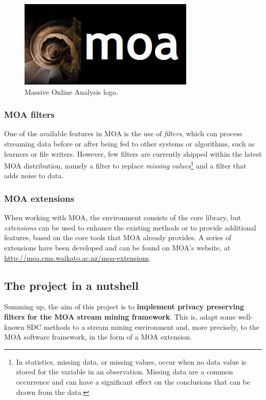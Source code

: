 \begin{figure}[h]
	\centering
	\includegraphics[width=0.4\linewidth]{figures/moa-logo.jpg}
	\caption[MOA logo.]{Massive Online Analysis logo.}
	\label{fig:moa-logo}
\end{figure}

\subsubsection{MOA filters}

One of the available features in MOA is the use of \textit{filters}, which can process
streaming data before or after being fed to other systems or algorithms, such as learners
or file writers. However, few filters are currently shipped within the latest MOA distribution,
namely a filter to replace \textit{missing values}\footnote{In statistics, missing data, or missing values,
occur when no data value is stored for the variable in an observation. Missing data are a
common occurrence and can have a significant effect on the conclusions that can be drawn
from the data.} and a filter that adds noise to data.

\subsubsection{MOA extensions}

When working with MOA, the environment consists of the core library, but \textit{extensions}
can be used to enhance the existing methods or to provide additional features, based on
the core tools that MOA already provides. A series of extensions have been developed and can
be found on MOA's website, at \url{http://moa.cms.waikato.ac.nz/moa-extensions}.

\subsection{The project in a nutshell}
\label{Introduction::moa-ppsm::ProjectNutshell}

Summing up, the aim of this project is to \textbf{implement privacy preserving filters
for the MOA stream mining framework}. This is, adapt some well-known SDC methods to a stream mining environment and, more precisely, to the MOA software framework, in the form of a MOA extension.

